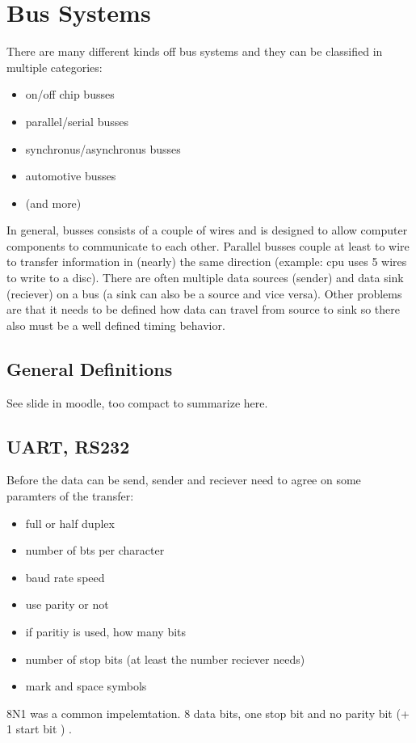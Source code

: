 \documentclass[a4paper]{scrartcl}
\begin{document}
    \section{Bus Systems}
        There are many different kinds off bus systems and they can be classified in multiple categories:
        \begin{itemize}
            \item on/off chip busses
            \item parallel/serial busses
            \item synchronus/asynchronus busses 
            \item automotive busses
            \item (and more)
        \end{itemize}
        In general, busses consists of a couple of wires and is designed to allow computer components to communicate to each other. Parallel busses couple at least to 
        wire to transfer information in (nearly) the same direction (example: cpu uses 5 wires to write to a disc). There are often multiple data sources (sender)
        and data sink (reciever) on a bus (a sink can also be a source and vice versa). Other problems are that it needs to be defined how data can travel from source to 
        sink so there also must be a well defined timing behavior.
        \subsection{General Definitions}
            See slide in moodle, too compact to summarize here.
        \subsection{UART, RS232}
            Before the data can be send, sender and reciever need to agree on some paramters of the transfer:
            \begin{itemize}
                \item full or half duplex
                \item number of bts per character
                \item baud rate speed 
                \item use parity or not
                \item if paritiy is used, how many bits
                \item number of stop bits (at least the number reciever needs)
                \item mark and space symbols %
            \end{itemize}
            8N1 was a common impelemtation. 8 data bits, one stop bit and no parity bit (+ 1 start bit )
            . 
\end{document}
